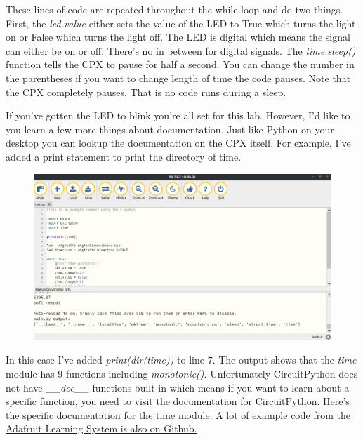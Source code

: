 These lines of code are repeated throughout the while loop and do two
things. First, the {\it led.value} either sets the value of the LED to
True which turns the light on or False which turns the light off. The
LED is digital which means the signal can either be on or off. There’s
no in between for digital signals. The {\it time.sleep()} function
tells the CPX to pause for half a second. You can change the number in
the parentheses if you want to change length of time the code
pauses. Note that the CPX completely pauses. That is no code runs
during a sleep.

If you’ve gotten the LED to blink you’re all set for this
lab. However, I’d like to you learn a few more things about
documentation. Just like Python on your desktop you can lookup the
documentation on the CPX itself. For example, I’ve added a print
statement to print the directory of time.
\begin{figure}[H]
  \begin{center}
    \includegraphics[width=\textwidth]{Figures/printtimeMu.png}
  \end{center}
\end{figure}
In this case I’ve added {\it print(dir(time))} to line 7. The output shows
that the {\it time} module has 9 functions including
{\it monotonic()}. Unfortunately CircuitPython does not have {\it \_\_doc\_\_}
functions built in which means if you want to learn about a specific
function, you need to visit the \href{https://circuitpython.readthedocs.io/en/5.3.x/README.html}{documentation for
CircuitPython}. Here’s the \href{https://circuitpython.readthedocs.io/en/latest/shared-bindings/time/index.html}{specific documentation for the} \href{https://circuitpython.readthedocs.io/en/latest/shared-bindings/time/index.html}{time}
\href{https://circuitpython.readthedocs.io/en/latest/shared-bindings/time/index.html}{module}. A lot of \href{https://github.com/adafruit/Adafruit_Learning_System_Guides/tree/master/CircuitPython_Essentials}{example code from the Adafruit Learning System is
also on Github.}

